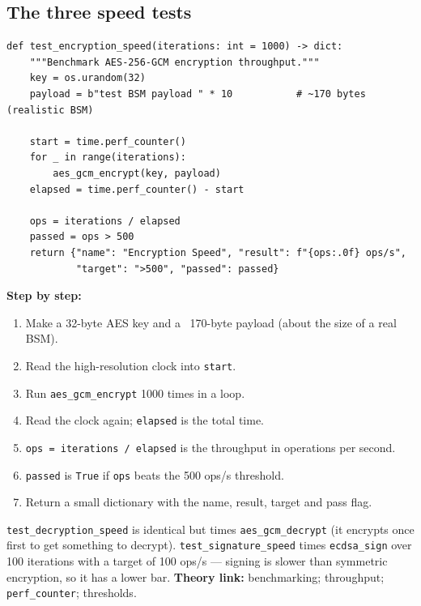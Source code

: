 \documentclass[11pt,a4paper]{article}
\begin{document}
\subsection{The three speed tests}
\begin{lstlisting}[style=py,caption={evaluate\_security.py --- a representative speed benchmark.}]
def test_encryption_speed(iterations: int = 1000) -> dict:
    """Benchmark AES-256-GCM encryption throughput."""
    key = os.urandom(32)
    payload = b"test BSM payload " * 10           # ~170 bytes (realistic BSM)

    start = time.perf_counter()
    for _ in range(iterations):
        aes_gcm_encrypt(key, payload)
    elapsed = time.perf_counter() - start

    ops = iterations / elapsed
    passed = ops > 500
    return {"name": "Encryption Speed", "result": f"{ops:.0f} ops/s",
            "target": ">500", "passed": passed}
\end{lstlisting}
\textbf{Step by step:}
\begin{enumerate}
  \item Make a 32-byte AES key and a ~170-byte payload (about the size of a real
        BSM).
  \item Read the high-resolution clock into \texttt{start}.
  \item Run \texttt{aes\_gcm\_encrypt} 1000 times in a loop.
  \item Read the clock again; \texttt{elapsed} is the total time.
  \item \texttt{ops = iterations / elapsed} is the throughput in operations per
        second.
  \item \texttt{passed} is \texttt{True} if \texttt{ops} beats the 500 ops/s
        threshold.
  \item Return a small dictionary with the name, result, target and pass flag.
\end{enumerate}
\texttt{test\_decryption\_speed} is identical but times \texttt{aes\_gcm\_decrypt}
(it encrypts once first to get something to decrypt). \texttt{test\_signature\_speed}
times \texttt{ecdsa\_sign} over 100 iterations with a target of 100 ops/s ---
signing is slower than symmetric encryption, so it has a lower bar.
\textbf{Theory link:} benchmarking; throughput; \texttt{perf\_counter};
thresholds.
\end{document}

